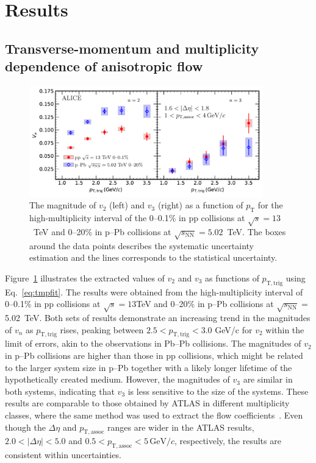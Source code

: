 
\section {Results}
\label{sec:results}
\subsection{Transverse-momentum and multiplicity dependence of anisotropic flow}

\begin{figure}[!b]
	\centering
	\hspace{-3em}\includegraphics[width=0.9\textwidth]{figures/FIG4_vn_pppPb.pdf} %
	\caption{The magnitude of $v_2$ (left) and $v_3$ (right) as a function of $p_\mathrm{T}$ for the high-multiplicity interval of the 0--0.1\% in pp collisions at $\sqrt{s}=13$~TeV and 0--20\% in p--Pb collisions at $\sqrt{s_\mathrm{NN}} = 5.02$~TeV. The boxes around the data points describes the systematic uncertainty estimation and the lines corresponds to the statistical uncertainty.}
	\label{fig:vn}
\end{figure}
Figure~\ref{fig:vn} illustrates the extracted values of $v_2$ and $v_3$ as functions of $p_{\mathrm{T,trig}}$ using Eq.~\ref{eq:tmpfit}. The results were obtained from the high-multiplicity interval of 0--0.1\% in pp collisions at $\sqrt{s}=13$TeV and 0--20\% in p--Pb collisions at $\sqrt{s_\mathrm{NN}}=$5.02~TeV. Both sets of results demonstrate an increasing trend in the magnitudes of $v_n$ as $p_{\mathrm{T,trig}}$ rises, peaking between $2.5<p_{\mathrm{T,trig}}<3.0$ GeV/c for $v_2$ within the limit of errors, akin to the observations in Pb--Pb collisions\cite{Abelev:2012di, ALICE:2018yph}.
The magnitudes of $v_2$ in p--Pb collisions are higher than those in pp collisions, which might be related to the larger system size in p--Pb together with a likely longer lifetime of the hypothetically created medium.
However, the magnitudes of $v_3$ are similar in both systems, indicating that $v_3$ is less sensitive to the size of the systems.
These results are comparable to those obtained by ATLAS in different multiplicity classes, where the same method was used to extract the flow coefficients~\cite{ATLAS:2016yzd}. Even though the $\Delta\eta$ and $p_{\mathrm{T,assoc}}$ ranges are wider in the ATLAS results, $2.0<|\Delta\eta|<5.0$ and $0.5<p_{\mathrm{T,assoc}}<5\,\mathrm{GeV}/c$, respectively, the results are consistent within uncertainties.

